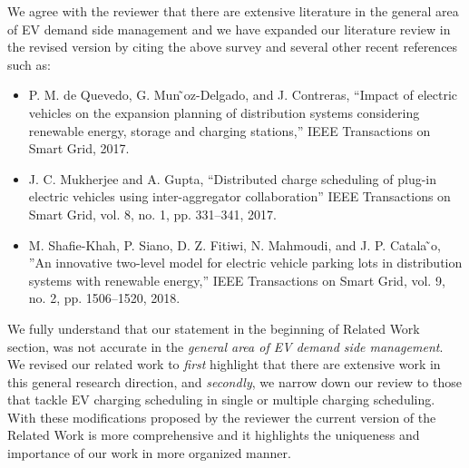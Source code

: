 \documentclass[11pt]{article}
\begin{document}
We agree with the reviewer that there are extensive literature in the general area of EV demand side management and we have expanded our literature review in the revised version by citing the above survey and several other recent references  such as: 
	 \begin{itemize}
	 	\item P. M. de Quevedo, G. Mun ̃oz-Delgado, and J. Contreras, ``Impact of electric vehicles on the expansion planning of distribution systems considering renewable energy, storage and charging stations,'' IEEE Transactions on Smart Grid, 2017.
	 		 	
	 	\item 	 J. C. Mukherjee and A. Gupta, ``Distributed charge scheduling of plug-in electric vehicles using inter-aggregator collaboration'' IEEE Transactions on Smart Grid, vol. 8, no. 1, pp. 331--341, 2017.
	 	
	 	\item M. Shafie-Khah, P. Siano, D. Z. Fitiwi, N. Mahmoudi, and J. P. Catala ̃o, ''An innovative two-level model for electric vehicle parking lots in distribution systems with renewable energy,'' IEEE Transactions on Smart Grid, vol. 9, no. 2, pp. 1506--1520, 2018.
	 \end{itemize}
We fully understand that our statement in the beginning of Related Work section, was not accurate in the \textit{general area of EV demand side management}. We revised our related work to \textit{first} highlight that there are extensive work in this general research direction, and \textit{secondly}, we narrow down our review to those that tackle EV charging scheduling in single or multiple charging scheduling. With these modifications proposed by the reviewer the current version of the Related Work is more comprehensive and it highlights the uniqueness and importance of our work in more organized manner.
\end{document}
